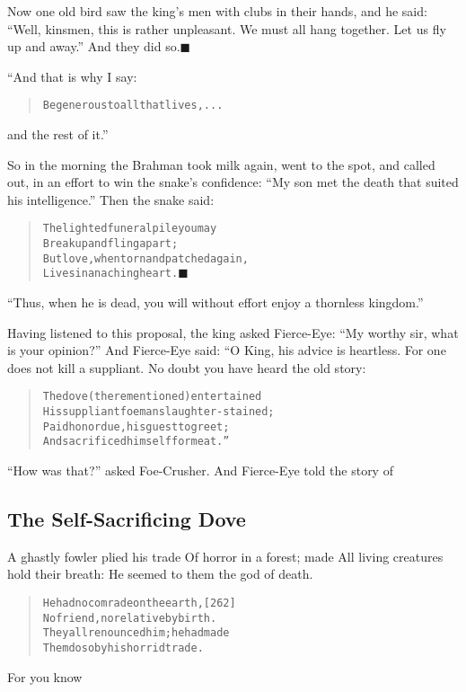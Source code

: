 \documentclass[article, twoside, 14pt]{memoir}
\newcommand{\qed}{\hfill \ensuremath{\blacksquare}}
\renewenvironment{verbatim}{%
\begin{quote}%
\vskip -10pt%
\begin{alltt}\normalfont\large}{\end{alltt}%
\end{quote}%
\vskip -10pt
} %
\begin{document}
Now one old bird saw the king's men with clubs in their hands, and
he said:
``Well, kinsmen, this is rather unpleasant. We must all hang together. Let us fly up and away.''
And they did so.\hyperref[s54]{\qed}

“And that is why I say:

\begin{verbatim}
Be generous to all that lives, . . .
\end{verbatim}
and the rest of it.”

So in the morning the Brahman took milk again, went to the spot,
and called out, in an effort to win the snake's confidence:
``My son met the death that suited his intelligence.'' Then the
snake said:

\begin{verbatim}
The lighted funeral pile you may
    Break up and fling apart;
But love, when torn and patched again,
    Lives in an aching heart.\hyperref[s53]{\qed}
\end{verbatim}
``Thus, when he is dead, you will without effort enjoy a thornless kingdom.''

Having listened to this proposal, the king asked Fierce-Eye:
``My worthy sir, what is your opinion?'' And Fierce-Eye said: “O
King, his advice is heartless. For one does not kill a suppliant.
No doubt you have heard the old story:

\begin{verbatim}
The dove (there mentioned) entertained
His suppliant foeman slaughter-stained;
Paid honor due, his guest to greet;
And sacrificed himself for meat.”
\end{verbatim}
``How was that?'' asked Foe-Crusher. And Fierce-Eye told the story
of

\subsection{The Self-Sacrificing Dove}

\label{s55} A ghastly fowler plied his trade Of horror in a forest;
made All living creatures hold their breath: He seemed to them the
god of death.

\begin{verbatim}
He had no comrade on the earth,                         [262]
No friend, no relative by birth.
They all renounced him; he had made
Them do so by his horrid trade.
\end{verbatim}
For you know
\end{document}
